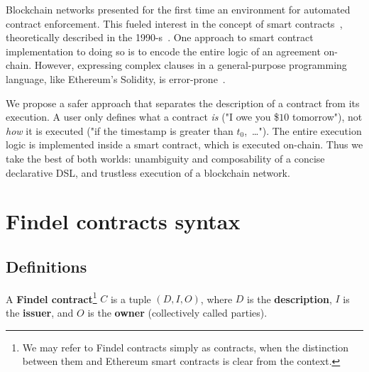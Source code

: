 Blockchain networks presented for the first time an environment for automated contract enforcement.
This fueled interest in the concept of smart contracts~\cite{Castillo2016}, theoretically described in the 1990-s~\cite{Szabo1997}.
One approach to smart contract implementation to doing so is to encode the entire logic of an agreement on-chain.
However, expressing complex clauses in a general-purpose programming language, like Ethereum's Solidity, is error-prone~\cite{Sirer2016, Atzei2017}.

We propose a safer approach that separates the description of a contract from its execution.
A user only defines what a contract \textit{is} ("I owe you \$$10$ tomorrow"), not \textit{how} it is executed ("if the timestamp is greater than $t_0$,~\dots").
The entire execution logic is implemented inside a smart contract, which is executed on-chain.
Thus we take the best of both worlds: unambiguity and composability of a concise declarative DSL, and trustless execution of a blockchain network.



\section{Findel contracts syntax} \label{sec:Ch10FindelSyntax}

\subsection{Definitions} \label{sec:Ch10FindelDefinitions}

\begin{definition} \label{def:Ch10FindelFindelContract}
	A \textbf{Findel contract}\footnote{We may refer to Findel contracts simply as contracts, when the distinction between them and Ethereum smart contracts is clear from the context.} $C$ is a tuple $(D,I,O)$, where $D$ is the \textbf{description}, $I$ is the \textbf{issuer}, and $O$ is the \textbf{owner} (collectively called parties). 
\end{definition}

